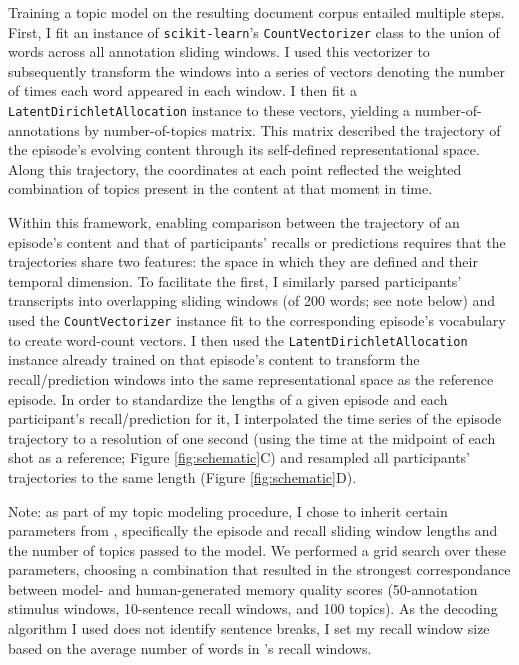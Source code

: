 \documentclass{article}
\begin{document}
Training a topic model on the resulting document corpus entailed multiple steps.  First, I fit an instance of \texttt{scikit-learn}'s \texttt{CountVectorizer} class to the union of words across all annotation sliding windows.  I used this vectorizer to subsequently transform the windows into a series of vectors denoting the number of times each word appeared in each window.  I then fit a \texttt{LatentDirichletAllocation} instance to these vectors, yielding a number-of-annotations by number-of-topics matrix.  This matrix described the trajectory of the episode's evolving content through its self-defined representational space.  Along this trajectory, the coordinates at each point reflected the weighted combination of topics present in the content at that moment in time. 

Within this framework, enabling comparison between the trajectory of an episode's content and that of participants' recalls or predictions requires that the trajectories share two features: the space in which they are defined and their temporal dimension.  To facilitate the first, I similarly parsed participants' transcripts into overlapping sliding windows (of 200 words; see note below) and used the \texttt{CountVectorizer} instance fit to the corresponding episode's vocabulary to create word-count vectors. I then used the \texttt{LatentDirichletAllocation} instance already trained on that episode's content to transform the recall/prediction windows into the same representational space as the reference episode.  In order to standardize the lengths of a given episode and each participant's recall/prediction for it, I interpolated the time series of the episode trajectory to a resolution of one second (using the time at the midpoint of each shot as a reference; Figure \ref{fig:schematic}C) and resampled all participants' trajectories to the same length (Figure \ref{fig:schematic}D).  

Note: as part of my topic modeling procedure, I chose to inherit certain parameters from \cite{HeusEtal18c}, specifically the episode and recall sliding window lengths and the number of topics passed to the model.  We performed a grid search over these parameters, choosing a combination that resulted in the strongest correspondance between model- and human-generated memory quality scores (50-annotation stimulus windows, 10-sentence recall windows, and 100 topics).  As the decoding algorithm I used does not identify sentence breaks, I set my recall window size based on the average number of words in \cite{HeusEtal18c}'s recall windows.
\FloatBarrier
\end{document}

